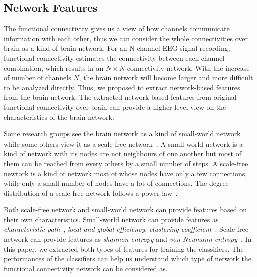 \subsection{Network Features}
The functional connectivity gives us a view of how channels communicate information with each other, thus we can consider the whole connectivities over brain as a kind of brain network. For an N-channel EEG signal recording, functional connectivity estimates the connectivity between each channel combination, which results in an $N \times N$ connectivity network. With the increase of number of channels $N$, the brain network will become larger and more difficult to be analyzed directly. Thus, we proposed to extract network-based features from the brain network. The extracted network-based features from original functional connectivity over brain can provide a higher-level view on the characteristics of the brain network. 

Some research groups see the brain network as a kind of small-world network~\cite{bassett2006small} while some others view it as a scale-free network~\cite{eguiluz2005scale}. A small-world network is a kind of network with its nodes are not neighbours of one another but most of them can be reached from every others by a small number of steps. A scale-free newtork is a kind of network most of whose nodes have only a few connections, while only a small number of nodes have a lot of connections. The degree distribution of a scale-free network follows a power law~\cite{stam2004functional}. 

Both scale-free network and small-world network can provide features based on their own characteristics. Small-world network can provide features as \emph{characteristic path}~\cite{watts1998collective}, \emph{local and global efficiency}, \emph{clustering coefficient}~\cite{latora2001efficient}. Scale-free network can provide features as \emph{shannon entropy} and \emph{von Neumann entropy}~\cite{passerini2008neumann}. In this paper, we extracted both types of features for training the classifiers. The performances of the classifiers can help us understand which type of network the functional connectivity network can be considered as. 

